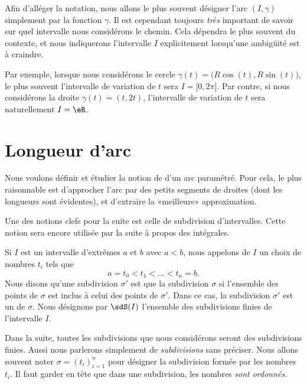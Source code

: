 \newcommand{\CaptionFigExempleArcParam}{Des exemples d'arcs paramétrées. Ceux ne sont pas des graphes.}


\begin{remark}
    Afin d'alléger la notation, nous allons le plus souvent désigner l'arc $(I,\gamma)$ simplement par la fonction $\gamma$. Il est cependant toujours \emph{très} important de savoir sur quel intervalle nous considérons le chemin. Cela dépendra le plus souvent du contexte, et nous indiquerons l'intervalle $I$ explicitement lorsqu'une ambigüité est à craindre.

    Par exemple, lorsque nous considérons le cercle $\gamma(t)=\big( R\cos(t),R\sin(t) \big)$, le plus souvent l'intervalle de variation de $t$ sera $I=\mathopen[ 0 , 2\pi \mathclose]$. Par contre, si nous considérons la droite $\gamma(t)=(t,2t)$, l'intervalle de variation de $t$ sera naturellement $I=\eR$.
\end{remark}

\section{Longueur d'arc}        \label{SecLongArc}

Nous voulons définir et étudier la notion de  d'un arc paramétré. Pour cela, le plus raisonnable est d'approcher l'arc par des petits segments de droites (dont les longueurs sont évidentes), et d'extraire la «meilleure» approximation.

Une des notions clefs pour la suite est celle de subdivision d'intervalles. Cette notion sera encore utilisée par la suite à propos des intégrales.
\begin{definition}      \label{DefSubdivisionIntervalle}
    Si $I$ est un intervalle d'extrêmes $a$ et $b$ avec $a<b$, nous appelons  de $I$ un choix de nombres $t_i$ tels que
    \begin{equation}
        a=t_0<t_1<\ldots<t_n=b.
    \end{equation}
    Nous disons qu'une subdivision $\sigma'$ est  que la subdivision $\sigma$ si l'ensemble des points de $\sigma$ est inclus à celui des points de $\sigma'$. Dans ce cas, la subdivision $\sigma'$ est un  de $\sigma$. Nous désignons par $\sdS(I)$ l'ensemble des subdivisions finies de l'intervalle $I$.
\end{definition}
Dans la suite, toutes les subdivisions que nous considérons seront des subdivisions finies. Aussi nous parlerons simplement de \emph{subdivisions} sans préciser. Nous allons souvent noter $\sigma=(t_i)_{i=1}^n$ pour désigner la subdivision formée par les nombres $t_i$. Il faut garder en tête que dans une subdivision, les nombres \emph{sont ordonnés}.

